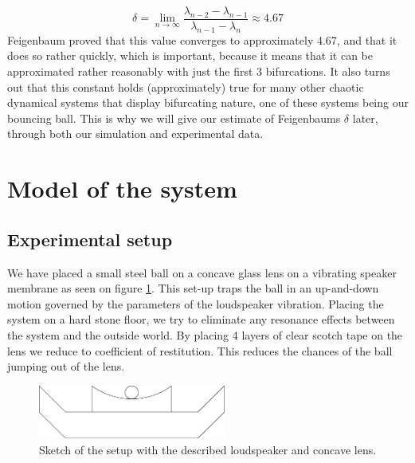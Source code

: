 \documentclass[12pt,oneside,a4paper]{article}
\numberwithin{equation}{section}
\begin{document}
{{{{\begin{equation}
\delta=\lim_{n \to \infty} \frac{\lambda_{n-2} - \lambda_{n-1}}{\lambda_{n-1}-\lambda_n} \approx 4.67 \label{Feigenbaumsdelta}
\end{equation}
Feigenbaum proved that this value converges to approximately 4.67, and that it does so rather quickly, which is important, because it means that it can be approximated rather reasonably with just the first 3 bifurcations. It also turns out that this constant holds (approximately) true for many other chaotic dynamical systems that display bifurcating nature, one of these systems being our bouncing ball. This is why we will give our estimate of Feigenbaums $\delta$ later, through both our simulation and experimental data.
\section{Model of the system}
\label{modelling}
\subsection{Experimental setup}
We have placed a small steel ball on a concave glass lens on a vibrating speaker membrane as seen on figure \ref{sketch}. This set-up traps the ball in an up-and-down motion governed by the parameters of the loudspeaker vibration. Placing the system on a hard stone floor, we try to eliminate any resonance effects between the system and the outside world. By placing 4 layers of clear scotch tape on the lens we 
reduce to coefficient of restitution. This reduces the chances of the ball jumping out of the lens. 
\begin{figure}[h]
	\centering
	\includegraphics[width=0.55\textwidth]{speaker}
	\caption{Sketch of the setup with the described loudspeaker and concave lens.}
	\label{sketch}
\end{figure}
}}}}
\end{document}
